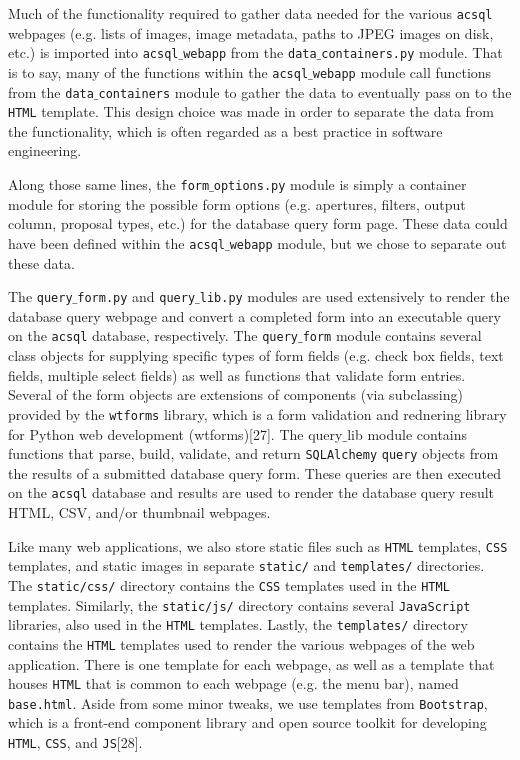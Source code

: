 \documentclass[10pt,journal,compsoc]{IEEEtran}
\begin{document}
Much of the functionality required to gather data needed for the various \texttt{acsql} webpages (e.g. lists of images, image metadata, paths to JPEG images on disk, etc.) is imported
into \texttt{acsql$\_$webapp} from the \texttt{data$\_$containers.py} module.  That is to say, many of the functions within the \texttt{acsql$\_$webapp} module call functions from
the \texttt{data$\_$containers} module to gather the data to eventually pass on to the \texttt{HTML} template.  This design choice was made in order to separate the data from the
functionality, which is often regarded as a best practice in software engineering.

Along those same lines, the \texttt{form$\_$options.py} module is simply a container module for storing the possible form options (e.g. apertures, filters, output column, proposal types,
etc.) for the database query form page.  These data could have been defined within the \texttt{acsql$\_$webapp} module, but we chose to separate out these data.

The \texttt{query$\_$form.py} and \texttt{query$\_$lib.py} modules are used extensively to render the database query webpage and convert a completed form into an executable query on
the \texttt{acsql} database, respectively.  The \texttt{query$\_$form} module contains several class objects for supplying specific types of form fields (e.g. check box fields, text fields,
multiple select fields) as well as functions that validate form entries.  Several of the form objects are extensions of components (via subclassing) provided by the \texttt{wtforms} library,
which is a form validation and rednering library for Python web development (wtforms)[27].  The {query$\_$lib} module contains functions that parse, build, validate, and return \texttt{SQLAlchemy}
\texttt{query} objects from the results of a submitted database query form.  These queries are then executed on the \texttt{acsql} database and results are used to render the database query
result HTML, CSV, and/or thumbnail webpages.

Like many web applications, we also store static files such as \texttt{HTML} templates, \texttt{CSS} templates, and static images in separate \texttt{static/} and \texttt{templates/} directories.
The \texttt{static/css/} directory contains the \texttt{CSS} templates used in the \texttt{HTML} templates.  Similarly, the \texttt{static/js/} directory contains several \texttt{JavaScript} libraries,
also used in the \texttt{HTML} templates. Lastly, the \texttt{templates/} directory contains the \texttt{HTML} templates used to render the various webpages of the web application.  There is one
template for each webpage, as well as a template that houses \texttt{HTML} that is common to each webpage (e.g. the menu bar), named \texttt{base.html}. Aside from some minor tweaks, we use
templates from \texttt{Bootstrap}, which is a front-end component library and open source toolkit for developing \texttt{HTML}, \texttt{CSS}, and \texttt{JS}[28].
\end{document}
